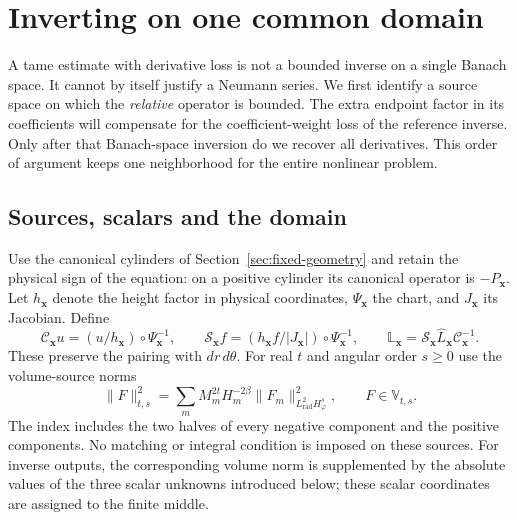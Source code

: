 \section{Inverting on one common domain}
\label{sec:stable-inverse}
\label{sec:grn-fixed-phase-green}

A tame estimate with derivative loss is not a bounded inverse on a
single Banach space. It cannot by itself justify a Neumann series.
We first identify a source space on which the \emph{relative}
operator is bounded. The extra endpoint factor in its coefficients
will compensate for the coefficient-weight loss of the reference
inverse. Only after that Banach-space inversion do we recover all
derivatives. This order of argument keeps one neighborhood for the
entire nonlinear problem.

\subsection{Sources, scalars and the domain}

Use the canonical cylinders of Section~\ref{sec:fixed-geometry} and
retain the physical sign of the equation: on a positive cylinder its
canonical operator is $-P_{\mathbf x}$. Let $h_{\mathbf x}$ denote the
height factor in physical coordinates, $\Psi_{\mathbf x}$ the chart,
and $J_{\mathbf x}$ its Jacobian. Define
\[
 \mathscr C_{\mathbf x}u=(u/h_{\mathbf x})\circ\Psi_{\mathbf x}^{-1},
 \qquad
 \mathscr S_{\mathbf x}f=(h_{\mathbf x}f/|J_{\mathbf x}|)
                                      \circ\Psi_{\mathbf x}^{-1},
 \qquad
 \mathbb L_{\mathbf x}=
 \mathscr S_{\mathbf x}\widehat L_{\mathbf x}\mathscr C_{\mathbf x}^{-1}.
\]
These preserve the pairing with $dr\,d\theta$. For real $t$ and
angular order $s\ge0$ use the volume-source norms
\begin{equation}\label{eq:vol-source-spaces}
 \|F\|_{t,s}^2
 =\sum_m M_m^{2t}H_m^{-2\beta}
                  \|F_m\|_{L^2_{\mathrm{rad}}H^s_\varphi}^2,
 \qquad F\in\mathbb V_{t,s}.
\end{equation}
The index includes the two halves of every negative component and
the positive components. No matching or integral condition is imposed
on these sources. For inverse outputs, the corresponding volume norm is supplemented
by the absolute values of the three scalar unknowns introduced below;
these scalar coordinates are assigned to the finite middle.


